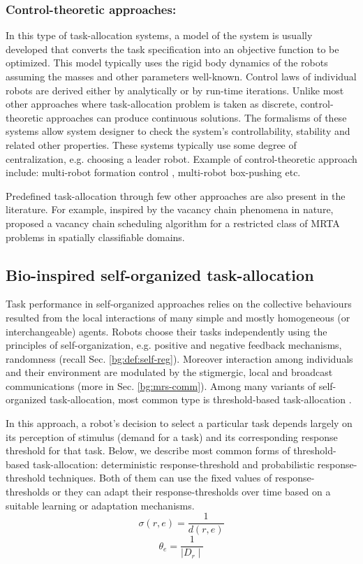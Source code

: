 \subsubsection*{Control-theoretic approaches:}
In this type of task-allocation systems, a model of the system is usually developed that converts the task specification into an objective function to be optimized. This model typically  uses  the rigid  body dynamics of the robots assuming the masses and other parameters well-known. Control laws of individual robots are derived either by analytically or by run-time iterations. Unlike most other approaches where task-allocation problem is taken as discrete, control-theoretic approaches can produce continuous  solutions. The formalisms of these systems allow system designer to check the system's controllability, stability and related other properties.  These systems typically use some degree of centralization, e.g. choosing a leader robot.  Example of control-theoretic approach include: multi-robot formation control \cite{Belta+2004}, multi-robot box-pushing \cite{Pereira+2003}  etc.

Predefined task-allocation through few other approaches are also present in the literature. For example, inspired by the vacancy chain phenomena in nature,  proposed a vacancy chain scheduling algorithm for a restricted class of MRTA problems in spatially classifiable domains.
\subsection{Bio-inspired self-organized task-allocation}
\label{bg:mrta:self-organized}
Task performance in self-organized approaches relies on the collective behaviours resulted from the local interactions of many simple and mostly homogeneous (or interchangeable) agents. Robots choose their tasks independently using the principles of self-organization, e.g. positive and negative feedback mechanisms, randomness (recall Sec. \ref{bg:def:self-reg}). Moreover interaction among individuals and their environment are modulated by the stigmergic, local and broadcast communications (more in Sec. \ref{bg:mrs-comm}).  Among many variants of self-organized task-allocation, most common type is threshold-based task-allocation \cite{Bonabeau+1999}. 

In this approach, a robot's decision to select a particular task depends largely on its perception of stimulus (demand for a task) and its corresponding response threshold for that task. Below, we describe most common forms of threshold-based task-allocation:  deterministic response-threshold and probabilistic response-threshold techniques. Both of them can use the fixed values of response-thresholds or they can adapt their response-thresholds over time based on a suitable learning or adaptation mechanisms.
\begin{equation}
\label{eqn:fixed-response-th1}
\sigma (r,e) = \frac{1}{d(r,e)}
\end{equation}
\begin{equation}
\label{eqn:fixed-response-th2}
\theta_{e} = \frac{1}{\mid D_{r} \mid}
\end{equation}
